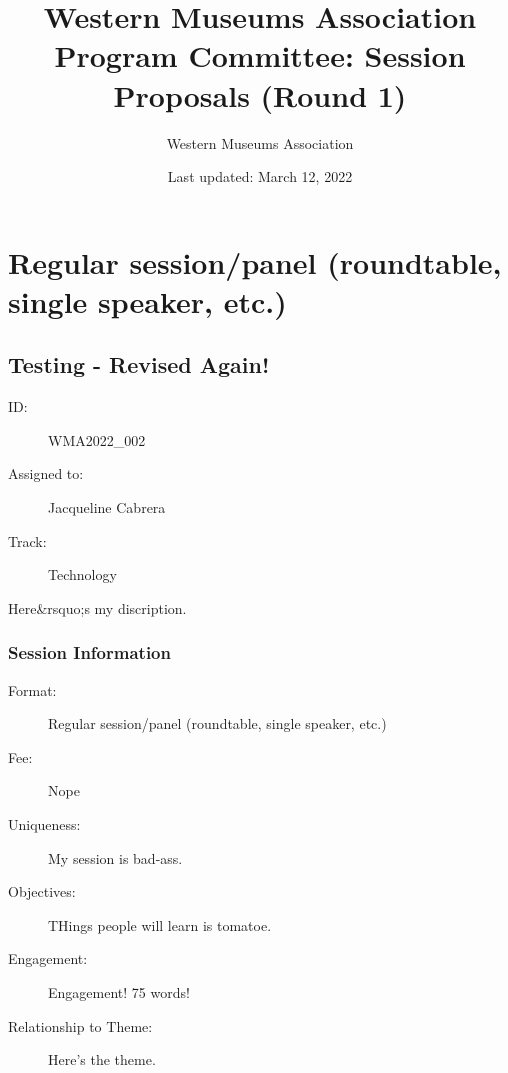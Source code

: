 \documentclass{report}
\title{ Western Museums Association Program Committee: Session Proposals (Round 1)}
\date{ Last updated: March 12, 2022}
\author{Western Museums Association}
\begin{document}
  \maketitle
  \newpage
  \tableofcontents
  \newpage
  
    \newpage
    \chapter*{ Regular session/panel (roundtable, single speaker, etc.) }

      
        
        
        
        
        
          \newpage
          \section{ Testing - Revised Again! }
            \begin{description}
              \item [ID:]
              WMA2022\_002

              \item [Assigned to:]Jacqueline Cabrera~
                \item [Track:]Technology~
              \end{description}

              Here\&rsquo;s my discription.

              \subsection*{Session Information}
                \begin{description}
                  \item [Format:] Regular session/panel (roundtable, single speaker, etc.)
							    
								  \item [Fee:]Nope
							     
							    \item [Uniqueness:]My session is bad-ass.
							    \item [Objectives:]THings people will learn is tomatoe.
							    \item [Engagement:]Engagement! 75 words!
							    \item [Relationship to Theme:]Here's the theme.
							    
                \end{description}
\end{document}
